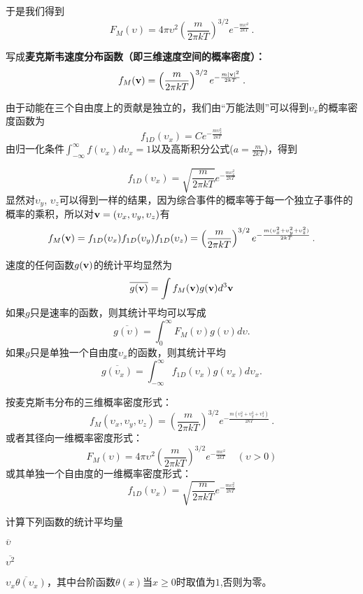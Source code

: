 \documentclass[CJK]{beamer}
\begin{document}
\begin{frame}
\bch
{\small
于是我们得到
$$F_M(\upsilon) = 4\pi \upsilon^2 \left(\frac{m}{2\pi kT}\right)^{3/2} e^{-\frac{m\upsilon^2}{2kT}}\,.$$

写成{\bf \blue 麦克斯韦速度分布函数（即三维速度空间的概率密度）：
$$f_M({\mathbf{v}}) = \left(\frac{m}{2\pi kT}\right)^{3/2} e^{-\frac{m|{\mathbf{v}}|^2}{2kT}}\, .$$}
}
\ech
\end{frame}

\begin{frame}
\bch
{\small
由于动能在三个自由度上的贡献是独立的，我们由“万能法则”可以得到$\upsilon_x$的概率密度函数为
$$ f_{1D}(\upsilon_x) =  C e^{-\frac{m\upsilon_x^2}{2kT}}$$
由归一化条件$\int_{-\infty}^\infty f(\upsilon_x)d\upsilon_x = 1$以及高斯积分公式($a = \frac{m}{2kT}$)，得到

$$ f_{1D}(\upsilon_x) =   \sqrt{\frac{m}{2\pi kT}} e^{-\frac{m\upsilon_x^2}{2kT}}$$
显然对$\upsilon_y$, $\upsilon_z$可以得到一样的结果，因为综合事件的概率等于每一个独立子事件的概率的乘积，所以对${\mathbf{v}} = (\upsilon_x, \upsilon_y, \upsilon_z)$有
$$f_M({\mathbf{v}}) = f_{1D}(\upsilon_x)f_{1D}(\upsilon_y)f_{1D}(\upsilon_z)=  \left(\frac{m}{2\pi kT}\right)^{3/2} e^{-\frac{m(\upsilon_x^2+\upsilon_y^2+\upsilon_z^2)}{2kT}}   \, .$$
}
\ech
\end{frame}

\begin{frame}
\bch
速度的任何函数$g({\mathbf{v}})$的统计平均显然为
{\blue $$\overline{g({\mathbf{v}})} = \int f_M({\mathbf{v}}) g({\mathbf{v}}) d^3{\mathbf{v}}$$}
如果$g$只是速率的函数，则其统计平均可以写成
{\blue $$\overline{g(\upsilon)} = \int_0^{\infty} F_M(\upsilon) g(\upsilon)d\upsilon.$$}
如果$g$只是单独一个自由度$\upsilon_x$的函数，则其统计平均
{\blue $$\overline{g(\upsilon_x)} = \int_{-\infty}^{\infty} f_{1D}(\upsilon_x) g(\upsilon_x)d\upsilon_x.$$}

\ech
\end{frame}

\begin{frame}
\bch
{\small
按麦克斯韦分布的三维概率密度形式：
$$f_M(\upsilon_x, \upsilon_y, \upsilon_z) =\left(\frac{m}{2\pi kT}\right)^{3/2} e^{-\frac{m(\upsilon_x^2+\upsilon_y^2+\upsilon_z^2)}{2kT}}   \, .$$
或者其径向一维概率密度形式：
$$F_M(\upsilon) = 4\pi \upsilon^2 \left(\frac{m}{2\pi kT}\right)^{3/2} e^{-\frac{m\upsilon^2}{2kT}}\,\ \ \ \ (\upsilon>0)$$
或其单独一个自由度的一维概率密度形式：
$$ f_{1D}(\upsilon_x) =   \sqrt{\frac{m}{2\pi kT}} e^{-\frac{m\upsilon_x^2}{2kT}}$$

计算下列函数的统计平均量
\bitem
\item{ $\overline{\upsilon}$ }
\item{ $\overline{\upsilon^2}$ }
\item{ $\overline{\upsilon_x\theta(\upsilon_x)}$，其中台阶函数$\theta(x)$当$x\ge 0$时取值为$1$,否则为零。}
\eitem}
\ech
\end{frame}
\end{document}
